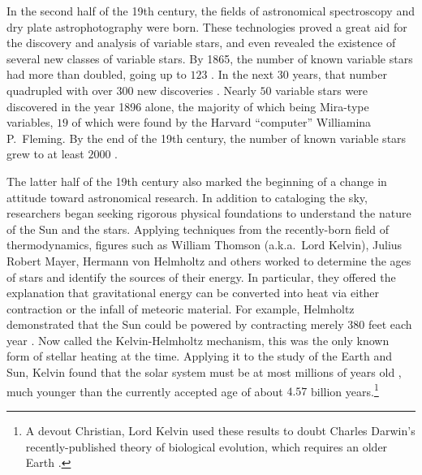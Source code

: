 In the second half of the 19th century, the fields of astronomical spectroscopy and dry plate astrophotography were born. 
These technologies proved a great aid for the discovery and analysis of variable stars, and even revealed the existence of several new classes of variable stars. 
By 1865, the number of known variable stars had more than doubled, going up to $123$ \citep{1865AN.....63..117C}. %
In the next $30$ years, that number quadrupled with over $300$ new discoveries \citep[e.g.,][]{1997JAVSO..25..115H}. 
Nearly $50$ variable stars were discovered in the year 1896 alone, the majority of which being Mira-type variables, $19$ of which were found by the Harvard ``computer'' Williamina P.~Fleming. 
By the end of the 19th century, the number of known variable stars grew to at least $2000$ \citep[e.g.,][]{Samus2017}. %



The latter half of the 19th century also marked the beginning of a change in attitude toward astronomical research. 
In addition to cataloging the sky, researchers began seeking rigorous physical foundations to understand the nature of the Sun and the stars. 
Applying techniques from the recently-born field of thermodynamics, figures such as William Thomson (a.k.a.\ Lord Kelvin), Julius Robert Mayer, Hermann von Helmholtz and others worked to determine the ages of stars and identify the sources of their energy. %
In particular, they offered the explanation that gravitational energy can be converted into heat via either contraction or the infall of meteoric material. 
For example, Helmholtz demonstrated that the Sun could be powered by contracting merely $380$ feet each year \citep[e.g.,][]{ARNY1990211}. 
Now called the Kelvin-Helmholtz mechanism, this was the only known form of stellar heating at the time. 
Applying it to the study of the Earth and Sun, Kelvin found that the solar system must be at most millions of years old \citep[e.g.,][]{1895Natur..51..438K}, much younger than the currently accepted age of about $4.57$ billion years.\footnote{ A devout Christian, Lord Kelvin used these results to doubt Charles Darwin's recently-published theory of biological evolution, which requires an older Earth \citep{darwin}.}

